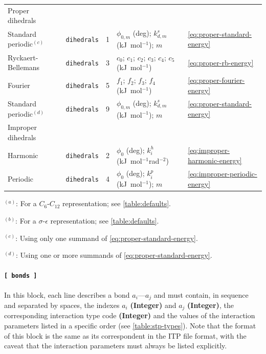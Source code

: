 \documentclass[10pt,a4paper,openany]{memoir}
\numberwithin{equation}{section}
\begin{document}
\begin{table}[tb]
\begin{tabular}{lccp{49ex}l}
Proper dihedrals &  &  &  & \\
\hspace{1ex} Standard periodic$^{(c)}$  & \texttt{dihedrals} &  1 & \(\phi_{0,m}\) (deg); \(k_{d,m}^s\) (kJ~mol$^{-1}$); \(m\) & \autoref{eq:proper-standard-energy}\\
\hspace{1ex} Ryckaert-Bellemans & \texttt{dihedrals} &  3 & \(c_0\); \(c_1\); \(c_2\); \(c_3\); \(c_4\); \(c_5\) (kJ~mol$^{-1}$)& \autoref{eq:proper-rb-energy}\\
\hspace{1ex} Fourier & \texttt{dihedrals} &  5 & \(f_1\); \(f_2\); \(f_3\); \(f_4\) (kJ~mol$^{-1}$) & \autoref{eq:proper-fourier-energy}\\
\hspace{1ex} Standard periodic$^{(d)}$  & \texttt{dihedrals} &  9 & \(\phi_{0,m}\) (deg); \(k_{d,m}^s\) (kJ~mol$^{-1}$); \(m\) & \autoref{eq:proper-standard-energy}\\
\hline
Improper dihedrals & &  &  & \\
\hspace{1ex} Harmonic & \texttt{dihedrals} &  2 & \(\phi_{0}\) (deg); \(k_i^h\) (kJ~mol$^{-1}$rad$^{-2}$)& \autoref{eq:improper-harmonic-energy}\\
\hspace{1ex} Periodic & \texttt{dihedrals} &  4 & \(\phi_{0}\) (deg); \(k_{i}^p\) (kJ~mol$^{-1}$); \(m\) & \autoref{eq:improper-periodic-energy}\\
\bottomrule
  \end{tabular}
  \vspace{1ex}\par
  {\footnotesize $^{(a)}$: For a $C_6$-$C_{12}$ representation; see \autoref{table:defaults}. \par $^{(b)}$: For a $\sigma$-$\epsilon$ representation; see \autoref{table:defaults}. \par $^{(c)}$: Using only one summand of \autoref{eq:proper-standard-energy}. \par $^{(d)}$: Using one or more summands of \autoref{eq:proper-standard-energy}.}
\end{table}

\paragraph{\texttt{[~bonds~]}}

In this block, each line describes a bond $a_i$---$a_j$ and must
contain, in sequence and separated by spaces, the indexes $a_i$
\textbf{(Integer)} and $a_j$ \textbf{(Integer)}, the corresponding
interaction type code \textbf{(Integer)} and the values of the
interaction parameters listed in a specific order (see
\autoref{table:stp-types}). Note that the format of this block is the
same as its correspondent in the ITP file format, with the caveat that
the interaction parameters must always be listed explicitly.
\end{document}
